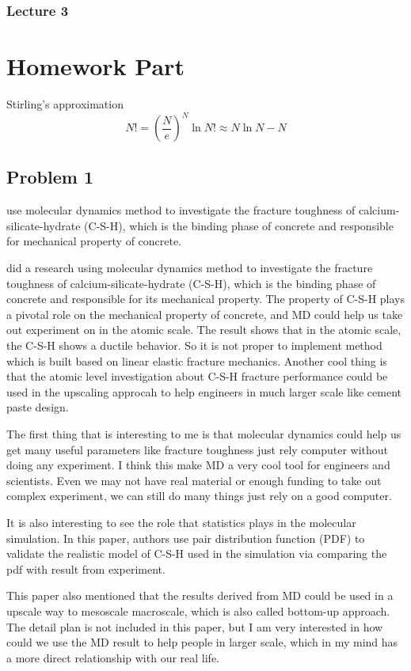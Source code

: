 \documentclass[a4paper]{article}
\begin{document}
\subsubsection{Lecture 3}

\bigskip
\section{Homework Part}
Stirling's approximation 
\begin{equation}
	N! = (\frac{N}{e})^{N}
	\ln N! \approx N\ln N- N
\end{equation}

\subsection{Problem 1}
use molecular dynamics method to investigate the fracture toughness of calcium-silicate-hydrate (C-S-H), which is the binding phase of concrete and responsible for mechanical property of concrete.

did a research using molecular dynamics method to investigate the fracture toughness of calcium-silicate-hydrate (C-S-H), which is the binding phase of concrete and responsible for its mechanical property. The property of C-S-H plays a pivotal role on the mechanical property of concrete, and MD could help us take out experiment on in the atomic scale. 
The result shows that in the atomic scale, the C-S-H shows a ductile behavior. So it is not proper to implement method which is built based on linear elastic fracture mechanics. Another cool thing is that the atomic level investigation about C-S-H fracture performance could be used in the upscaling approcah to help engineers in much larger scale like cement paste design.

The first thing that is interesting to me is that molecular dynamics could help us get many useful parameters like fracture toughness just rely computer without doing any experiment. I think this make MD a very cool tool for engineers and scientists. Even we may not have real material or enough funding to take out complex experiment, we can still do many things just rely on a good computer.

It is also interesting to see the role that statistics plays in the molecular simulation. In this paper, authors use pair distribution function (PDF) to validate the realistic model of C-S-H used in the simulation via comparing the pdf with result from experiment.

This paper also mentioned that the results derived from MD could be used in a upscale way to mesoscale macroscale, which is also called bottom-up approach. The detail plan is not included in this paper, but I am very interested in how could we use the MD result to help people in larger scale, which in my mind has a more direct relationship with our real life.
\end{document}
